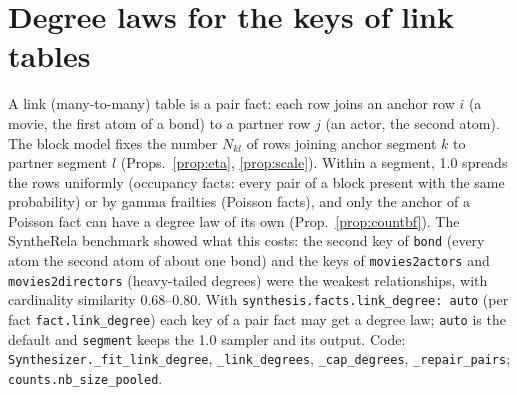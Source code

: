 \section{Degree laws for the keys of link tables}\label{sec:linkdeg}
A link (many-to-many) table is a pair fact: each row joins an anchor row $i$ (a movie, the first atom of a bond) to a partner row $j$ (an actor, the second atom). The block model fixes the number $N_{kl}$ of rows joining anchor segment $k$ to partner segment $l$ (Props.~\ref{prop:eta}, \ref{prop:scale}). Within a segment, 1.0 spreads the rows uniformly (occupancy facts: every pair of a block present with the same probability) or by gamma frailties (Poisson facts), and only the anchor of a Poisson fact can have a degree law of its own (Prop.~\ref{prop:countbf}). The SyntheRela benchmark showed what this costs: the second key of \texttt{bond} (every atom the second atom of about one bond) and the keys of \texttt{movies2actors} and \texttt{movies2directors} (heavy-tailed degrees) were the weakest relationships, with cardinality similarity 0.68--0.80. With \texttt{synthesis.facts.link\_degree: auto} (per fact \texttt{fact.link\_degree}) each key of a pair fact may get a degree law; \texttt{auto} is the default and \texttt{segment} keeps the 1.0 sampler and its output. Code: \texttt{Synthesizer.\_fit\_link\_degree}, \texttt{\_link\_degrees}, \texttt{\_cap\_degrees}, \texttt{\_repair\_pairs}; \texttt{counts.nb\_size\_pooled}.

